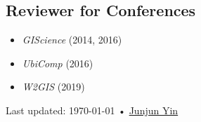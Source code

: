 \documentclass[11pt, a4paper]{article}
\begin{document}
\subsection*{Reviewer for Conferences}
\begin{itemize}
  \setlength\itemsep{0em}
  \item \emph{GIScience} (2014, 2016)
  \item \emph {UbiComp} (2016)
  \item \emph {W2GIS} (2019)
\end{itemize}
\vfill{}

\begin{center}
{\scriptsize  Last updated: \today\- •\- 
\href{https://yinjunjun.github.io}{Junjun Yin}}
\end{center}
\end{document}

